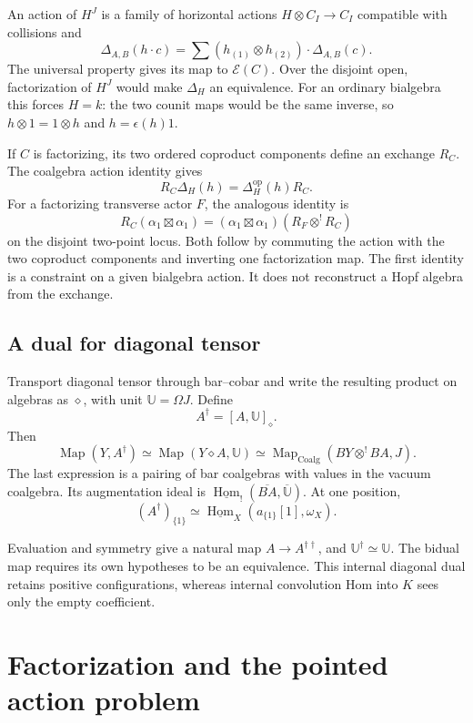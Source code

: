An action of
$H^J$ is a
family of horizontal
actions
$H\otimes C_I\to C_I$
compatible with
collisions and
\[
 \Delta_{A,B}(h\cdot c)
 =
 \sum(h_{(1)}\otimes h_{(2)})
       \cdot\Delta_{A,B}(c).
\]
The universal
property gives
its map to
$\mathcal E(C)$.
Over the disjoint
open, factorization
of $H^J$ would
make $\Delta_H$
an equivalence.
For an ordinary
bialgebra this
forces $H=k$:
the two counit
maps would be
the same inverse,
so $h\otimes1=1\otimes h$
and $h=\epsilon(h)1$.

If $C$ is
factorizing, its
two ordered
coproduct components
define an exchange
$R_C$. The
coalgebra action
identity gives
\[
 R_C\Delta_H(h)
 =\Delta_H^{\mathrm{op}}(h)R_C.
\]
For a factorizing
transverse actor
$F$, the analogous
identity is
\[
 R_C(\alpha_1\boxtimes\alpha_1)
 =
 (\alpha_1\boxtimes\alpha_1)
       (R_F\otimes^!R_C)
\]
on the disjoint
two-point locus.
Both follow by
commuting the
action with the
two coproduct
components and
inverting one
factorization map.
The first identity
is a constraint
on a given
bialgebra action.
It does not
reconstruct a
Hopf algebra
from the exchange.

\subsection{A dual for diagonal tensor}
\label{v4-arith:centers:subsec:diagonal-dual}

Transport diagonal
tensor through
bar--cobar and
write the resulting
product on algebras
as $\diamond$,
with unit
$\mathbb U=\Omega J$.
Define
\[
 A^\dagger=[A,\mathbb U]_\diamond.
\]
Then
\[
 \operatorname{Map}(Y,A^\dagger)
 \simeq
 \operatorname{Map}(Y\diamond A,\mathbb U)
 \simeq
 \operatorname{Map}_{\operatorname{Coalg}}
       (BY\otimes^!BA,J).
\]
The last expression
is a pairing
of bar coalgebras
with values in
the vacuum
coalgebra.
Its augmentation
ideal is
$\underline{\operatorname{Hom}}_!
(\overline{BA},\overline{\mathbb U})$.
At one position,
\[
 (A^\dagger)_{\{1\}}
 \simeq
 \underline{\operatorname{Hom}}_X
       (a_{\{1\}}[1],\omega_X).
\]

Evaluation and
symmetry give
a natural map
$A\to A^{\dagger\dagger}$,
and
$\mathbb U^\dagger\simeq\mathbb U$.
The bidual map
requires its own
hypotheses to
be an equivalence.
This internal
diagonal dual
retains positive
configurations,
whereas internal
convolution Hom
into $K$ sees
only the empty
coefficient.

\section{Factorization and the pointed action problem}
\label{v4-arith:centers:sec:pointed}


